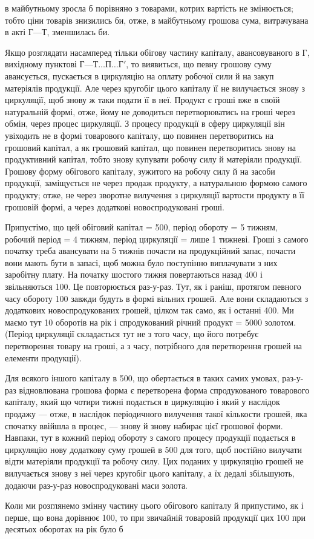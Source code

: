 \parcont{}  %
в майбутньому зросла б порівняно з товарами, котрих вартість не змінюється;
тобто ціни товарів знизились би, отже, в майбутньому грошова
сума, витрачувана в акті $Г — Т$, зменшилась би.

Якщо розглядати насамперед тільки обігову частину капіталу, авансовуваного
в Г, вихідному пунктові $Г — Т\dots{} П\dots{} Г'$, то виявиться, що певну
грошову суму авансується, пускається в циркуляцію на оплату робочої
сили й на закуп матеріялів продукції. Але через кругобіг цього капіталу
її не вилучається знову з циркуляції, щоб знову ж таки подати її
в неї. Продукт є гроші вже в своїй натуральній формі, отже, йому не
доводиться перетворюватись на гроші через обмін, через процес
циркуляції. З процесу продукції в сферу циркуляції він увіходить не в
формі товарового капіталу, що повинен перетворитись на грошовий капітал,
а як грошовий капітал, що повинен перетворитись знову на продуктивний
капітал, тобто знову купувати робочу силу й матеріяли продукції.
Грошову форму обігового капіталу, зужитого на робочу силу й на засоби
продукції, заміщується не через продаж продукту, а натуральною
формою самого продукту; отже, не через зворотне вилучення з циркуляції
вартости продукту в її грошовій формі, а через додаткові новоспродуковані
гроші.

Припустімо, що цей обіговий капітал = 500, період обороту
= 5 тижням, робочий період = 4 тижням, період циркуляції = лише 1
тижневі. Гроші з самого початку треба авансувати на 5 тижнів почасти
на продукційний запас, почасти вони мають бути в запасі, щоб можна
було поступінно виплачувати з них заробітну плату. На початку шостого
тижня повертаються назад 400 і звільняються 100. Це
повторюється раз-у-раз. Тут, як і раніш, протягом певного часу обороту
100 завжди будуть в формі вільних грошей. Але вони складаються
з додаткових новоспродукованих грошей, цілком так само, як і останні
400. Ми маємо тут 10 оборотів на рік і спродукований річний
продукт = 5000 золотом. (Період циркуляції складається тут
не з того часу, що його потребує перетворення товару на гроші, а з
часу, потрібного для перетворення грошей на елементи продукції).

Для всякого іншого капіталу в 500, що обертається в таких
самих умовах, раз-у-раз відновлювана грошова форма є перетворена форма
спродукованого товарового капіталу, який що чотири тижні подається
в циркуляцію і який у наслідок продажу — отже, в наслідок періодичного
вилучення такої кількости грошей, яка спочатку ввійшла в процес, —
знову й знову набирає цієї грошової форми. Навпаки, тут в кожний період
обороту з самого процесу продукції подається в циркуляцію нову
додаткову суму грошей в 500 для того, щоб постійно вилучати
відти матеріяли продукції та робочу силу. Цих поданих у циркуляцію
грошей не вилучається знову з неї через кругобіг цього капіталу, а їх
дедалі збільшують, додаючи раз-у-раз новоспродуковані маси золота.

Коли ми розглянемо змінну частину цього обігового капіталу й припустимо,
як і перше, що вона дорівнює 100, то при звичайній
товаровій продукції цих 100 при десятьох оборотах на рік було б
\parbreak{}  %
